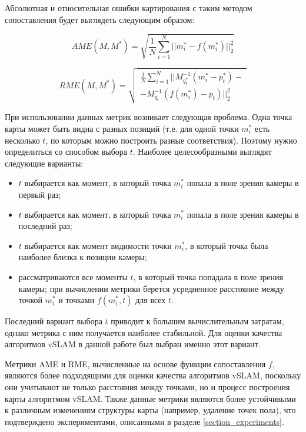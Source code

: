 \documentclass{mipt-thesis-ms}
\begin{document}
	Абсолютная и относительная ошибки картирования с таким методом сопоставления будет выглядеть следующим образом:
	
	\begin{equation}
		\label{eq_ame_our}
		AME(M, M^*) = \sqrt{\frac{1}{N} \sum\limits_{i=1}^N ||m_i^* - f(m_i^*)||_2^2}
	\end{equation}
	
	\begin{equation}
	\label{eq_rme_our}
	RME(M, M^*) = \sqrt{
	\begin{aligned}
	\frac{1}{N} \sum\limits_{i=1}^N ||M_{q_t^*}^{-1}(m_i^* - p_t^*) - \\
		- M_{q_t}^{-1} (f(m_i^*) - p_t)||_2^2
	\end{aligned}
	}
	\end{equation}
	
	При использовании данных метрик возникает следующая проблема. Одна точка карты может быть видна с разных позиций (т.е. для одной точки $m_i^*$ есть несколько $t$, по которым можно построить разные соответствия). Поэтому нужно определиться со способом выбора $t$. Наиболее целесообразными выглядят следующие варианты:
	
	\begin{itemize}
		\item $t$ выбирается как момент, в который точка $m_i^*$ попала в поле зрения камеры в первый раз;
		\item $t$ выбирается как момент, в который точка $m_i^*$ попала в поле зрения камеры в последний раз;
		\item $t$ выбирается как момент видимости точки $m_i^*$, в который точка была наиболее близка к позиции камеры;
		\item рассматриваются все моменты $t$, в который точка попадала в поле зрения камеры; при вычислении метрики берется усредненное расстояние между точкой $m_i^*$ и точками $f(m_i^*, t)$ для всех $t$.
	\end{itemize}

	Последний вариант выбора $t$ приводит к большим вычислительным затратам, однако метрика с ним получается наиболее стабильной. Для оценки качества алгоритмов vSLAM в данной работе был выбран именно этот вариант.
	
	Метрики AME и RME, вычисленные на основе функции сопоставления $f$, являются более подходящими для оценки качества алгоритмов vSLAM, поскольку они учитывают не только расстояния между точками, но и процесс построения карты алгоритмом vSLAM. Также данные метрики являются более устойчивыми к различным изменениям структуры карты (например, удаление точек пола), что подтверждено экспериментами, описанными в разделе \ref{section_experiments}.
	
\end{document}
